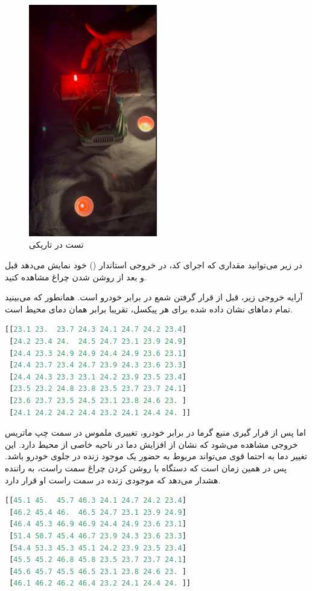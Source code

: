 \begin{figure}[H]
	\centering
	\includegraphics[width=0.5\textwidth]{figs/test_with_lights_off.jpg}
	\caption{تست در تاریکی}
	\label{fig:2}
\end{figure}

در زیر می‌توانید مقداری که اجرای کد، در خروجی استاندار () خود نمایش می‌دهد قبل و بعد از روشن شدن چراغ مشاهده کنید.


آرایه خروجی زیر، قبل از قرار گرفتن شمع در برابر خودرو است. همانطور که می‌بینید تمام دماها‌ی نشان داده شده برای هر پیکسل، تقریبا برابر همان دمای محیط است.
\begin{latin}
\begin{lstlisting}[language=python]
[[23.1 23.  23.7 24.3 24.1 24.7 24.2 23.4]
 [24.2 23.4 24.  24.5 24.7 23.1 23.9 24.9]
 [24.4 23.3 24.9 24.9 24.4 24.9 23.6 23.1]
 [24.4 23.7 23.4 24.7 23.9 24.3 23.6 23.3]
 [24.4 24.3 23.3 23.1 24.2 23.9 23.5 23.4]
 [23.5 23.2 24.8 23.8 23.5 23.7 23.7 24.1]
 [23.6 23.7 23.5 24.5 23.1 23.8 24.6 23. ]
 [24.1 24.2 24.2 24.4 23.2 24.1 24.4 24. ]]
\end{lstlisting}
\end{latin}

اما پس از قرار گیری منبع گرما در برابر خودرو، تغییری ملموس در سمت چپ ماتریس خروجی مشاهده می‌شود که نشان از افزایش دما در ناحیه خاصی از محیط دارد. این تغییر دما به احتما قوی می‌تواند مربوط به حضور یک موجود زنده در جلوی خودرو باشد. پس در همین زمان است که دستگاه با روشن کردن چراغ سمت راست، به راننده هشدار می‌دهد که موجودی زنده در سمت راست او قرار دارد.
\begin{latin}
\begin{lstlisting}[language=python]
[[45.1 45.  45.7 46.3 24.1 24.7 24.2 23.4]
 [46.2 45.4 46.  46.5 24.7 23.1 23.9 24.9]
 [46.4 45.3 46.9 46.9 24.4 24.9 23.6 23.1]
 [51.4 50.7 45.4 46.7 23.9 24.3 23.6 23.3]
 [54.4 53.3 45.3 45.1 24.2 23.9 23.5 23.4]
 [45.5 45.2 46.8 45.8 23.5 23.7 23.7 24.1]
 [45.6 45.7 45.5 46.5 23.1 23.8 24.6 23. ]
 [46.1 46.2 46.2 46.4 23.2 24.1 24.4 24. ]]
\end{lstlisting}
\end{latin}



